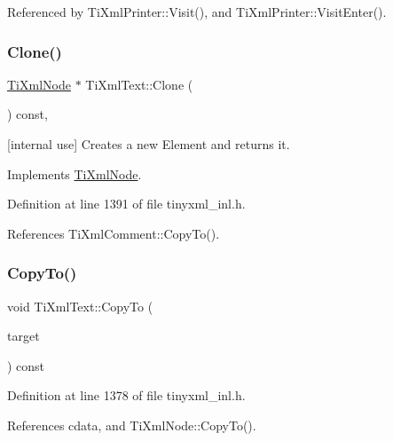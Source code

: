 Referenced by Ti\+Xml\+Printer\+::\+Visit(), and Ti\+Xml\+Printer\+::\+Visit\+Enter().

\hypertarget{class_ti_xml_text_a98a20d7a4f1c1478e25e34921be24bfe}{}\label{class_ti_xml_text_a98a20d7a4f1c1478e25e34921be24bfe} 
\subsubsection{\texorpdfstring{Clone()}{Clone()}}
{\footnotesize\ttfamily \hyperlink{class_ti_xml_node}{Ti\+Xml\+Node} $\ast$ Ti\+Xml\+Text\+::\+Clone (\begin{DoxyParamCaption}{ }\end{DoxyParamCaption}) const\hspace{0.3cm}{\ttfamily [protected]}, {\ttfamily [virtual]}}



\mbox{[}internal use\mbox{]} Creates a new Element and returns it. 



Implements \hyperlink{class_ti_xml_node_a4508cc3a2d7a98e96a54cc09c37a78a4}{Ti\+Xml\+Node}.



Definition at line 1391 of file tinyxml\+\_\+inl.\+h.



References Ti\+Xml\+Comment\+::\+Copy\+To().

\hypertarget{class_ti_xml_text_a480b8e0ad6b7833a73ecf2191195c9b5}{}\label{class_ti_xml_text_a480b8e0ad6b7833a73ecf2191195c9b5} 
\subsubsection{\texorpdfstring{Copy\+To()}{CopyTo()}}
{\footnotesize\ttfamily void Ti\+Xml\+Text\+::\+Copy\+To (\begin{DoxyParamCaption}\item[{\hyperlink{class_ti_xml_text}{Ti\+Xml\+Text} $\ast$}]{target }\end{DoxyParamCaption}) const\hspace{0.3cm}{\ttfamily [protected]}}



Definition at line 1378 of file tinyxml\+\_\+inl.\+h.



References cdata, and Ti\+Xml\+Node\+::\+Copy\+To().



